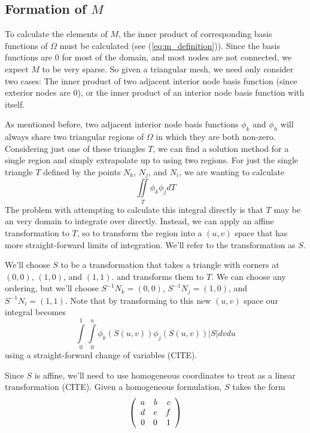 \subsection{Formation of $M$}
To calculate the elements of $M$, the inner product of corresponding basis functions of $\Omega$ must be calculated
(see (\ref{eq:m_definition})). Since the basis functions are 0 for most of the domain, and most nodes are not
connected, we expect $M$ to be very sparse. So given a triangular mesh, we need only consider two cases: The inner
product of two adjacent interior node basis function (since exterior nodes are 0), or the inner product of an interior
node basis function with itself.

As mentioned before, two adjacent interior node basis functions $\phi_k$ and $\phi_h$ will always share two triangular
regions of $\Omega$ in which they are both non-zero. Considering just one of these triangles $T$, we can find a solution method for a
single region and simply extrapolate up to using two regions. For just the single triangle $T$ defined by the points
$N_k$, $N_j$, and $N_i$, we are wanting to calculate
\begin{equation}
\iint\limits_T \phi_k \phi_j dT
\end{equation}
The problem with attempting to calculate this integral directly is that $T$ may be an very domain to integrate over
directly. Instead, we can apply an affine transformation to $T$, so to transform the region into a $(u,v)$ space that
has more straight-forward limits of integration. We'll refer to the transformation as $S$.

We'll choose $S$ to be a transformation that takes a triangle with corners at $(0,0)$, $(1,0)$, and $(1,1)$. and
transforms them to $T$. We can choose any ordering, but we'll choose $S^{-1}N_k = (0, 0)$, $S^{-1}N_j = (1, 0)$,
and $S^{-1}N_i = (1, 1)$. Note that
by transforming to this new $(u,v)$ space our integral becomes
\begin{equation}
\int\limits_0^1 \int\limits_0^u \phi_k(S(u, v)) \phi_j(S(u, v)) |S| dv du
\end{equation}
using a straight-forward change of variables (CITE).

Since $S$ is affine, we'll need to use homogeneous coordinates to treat as a linear transformation (CITE). Given a homogeneous
formulation, $S$ takes the form
\begin{equation}
\left(\begin{array}{rrrrrr}  a & b & c \\ d & e & f \\ 0 & 0 & 1  \\ \end{array} \right)
\end{equation}

